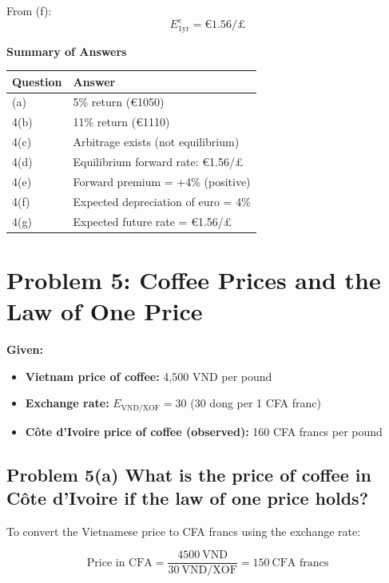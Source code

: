 \documentclass[
]{article}
\begin{document}
From (f):\\
\[
E^{e}_{1\text{yr}} = €1.56/\text{£}
\]

\textbf{Summary of Answers}

\begin{longtable}[]{@{}ll@{}}
\toprule\noalign{}
Question & Answer \\
\midrule\noalign{}
\endhead
\bottomrule\noalign{}
\endlastfoot
4(a) & 5\% return (€1050) \\
4(b) & 11\% return (€1110) \\
4(c) & Arbitrage exists (not equilibrium) \\
4(d) & Equilibrium forward rate: €1.56/£ \\
4(e) & Forward premium = +4\% (positive) \\
4(f) & Expected depreciation of euro = 4\% \\
4(g) & Expected future rate = €1.56/£ \\
\end{longtable}

\section{Problem 5: Coffee Prices and the Law of One
Price}\label{problem-5-coffee-prices-and-the-law-of-one-price}

\textbf{Given:}

\begin{itemize}
\item
  \textbf{Vietnam price of coffee:} 4,500 VND per pound
\item
  \textbf{Exchange rate:} \(E_{\text{VND/XOF}} = 30\) (30 dong per 1 CFA
  franc)
\item
  \textbf{Côte d'Ivoire price of coffee (observed):} 160 CFA francs per
  pound
\end{itemize}

\subsection{\texorpdfstring{Problem 5(a) What is the price of coffee in
Côte d'Ivoire \textbf{if the law of one price
holds}?}{Problem 5(a) What is the price of coffee in Côte d'Ivoire if the law of one price holds?}}\label{problem-5a-what-is-the-price-of-coffee-in-cuxf4te-divoire-if-the-law-of-one-price-holds}

To convert the Vietnamese price to CFA francs using the exchange rate:

\[
\text{Price in CFA} = \frac{4500 \ \text{VND}}{30 \ \text{VND/XOF}} = 150 \ \text{CFA francs}
\]
\end{document}
